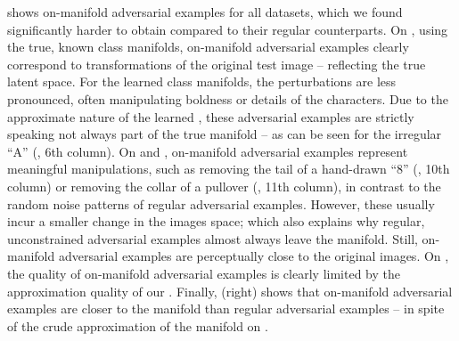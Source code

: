  shows on-manifold adversarial examples for all datasets, which we found significantly harder to obtain compared to their regular counterparts. On \Fonts, using the true, known class manifolds, on-manifold adversarial examples clearly correspond to transformations of the original test image -- reflecting the true latent space. For the learned class manifolds, the perturbations are less pronounced, often manipulating boldness or details of the characters. Due to the approximate nature of the learned \VAEGANs, these adversarial examples are strictly speaking not always part of the true manifold -- as can be seen for the irregular ``A'' (, 6th column). On \MNIST and \Fashion, on-manifold adversarial examples represent meaningful manipulations, such as removing the tail of a hand-drawn ``8'' (, 10th column) or removing the collar of a pullover (, 11th column), in contrast to the random noise patterns of regular adversarial examples. However, these usually incur a smaller change in the images space; which also explains why regular, unconstrained adversarial examples almost always leave the manifold. Still, on-manifold adversarial examples are perceptually close to the original images. On \Celeb, the quality of on-manifold adversarial examples is clearly limited by the approximation quality of our \VAEGANs. Finally,  (right) shows that on-manifold adversarial examples are closer to the manifold than regular adversarial examples -- in spite of the crude approximation of the manifold on \MNIST.

